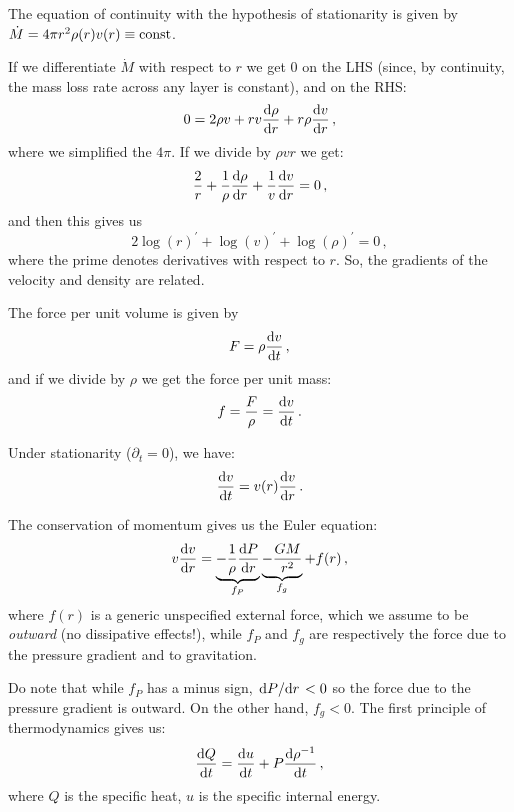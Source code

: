 \documentclass[main.tex]{subfiles}
\begin{document}
The equation of continuity with the hypothesis of stationarity is given by \(\dot{M} = 4 \pi r^2 \rho (r) v(r) \equiv \text{const}\).

If we differentiate \(\dot{M} \) with respect to \(r\) we get 0 on the LHS (since, by continuity, the mass loss rate across any layer is constant), and on the RHS: 
%
\begin{equation}
  0 = 2 \rho v + rv \dv{\rho }{r} + r \rho \dv{v}{r} 
\,,
\end{equation}
%
where we simplified the \(4 \pi \). If we divide by \(\rho v r \) we get: 
%
\begin{equation}
  \frac{2}{r} + \frac{1}{\rho }\dv{\rho }{r} + \frac{1}{v} \dv{v}{r} =0     
\,,
\end{equation}
%
and then this gives us 
%
\begin{equation}
  2\log(r)^{\prime } + \log(v)^{\prime } + \log(\rho)^{\prime } =0
\,,
\end{equation}
%
where the prime denotes derivatives with respect to \(r\).
So, the gradients of the velocity and density are related.

The force per unit volume is given by 
%
\begin{equation}
  F = \rho \dv{v}{t} 
\,,
\end{equation}
%
and if we divide by \(\rho \) we get the force per unit mass: 
%
\begin{equation}
  f = \frac{F}{\rho } = \dv{v}{t}  
\,.
\end{equation}

Under stationarity (\(\partial_t = 0\)), we have: 
%
\begin{equation}
  \dv{v}{t} = v(r) \dv{v}{r} 
\,.
\end{equation}
%

The conservation of momentum gives us the Euler equation: 
%
\begin{equation} \label{eq:momentum-conservation}
  v \dv{v}{r} = \underbrace{- \frac{1}{\rho } \dv{P}{r}}_{f_P} \underbrace{- \frac{GM}{r^2}}_{f_g} + f(r)
\,,
\end{equation}
%
where \(f(r)\) is a generic unspecified external force, which we assume to be \emph{outward} (no dissipative effects!), while \(f_P\) and \(f_g\) are respectively the force due to the pressure gradient and to gravitation.

Do note that while \(f_P\) has a minus sign, \(\dv*{P}{r}<0\) so the force due to the pressure gradient is outward. On the other hand, \(f_g<0\). 
The first principle of thermodynamics gives us:
%
\begin{equation}
  \dv{Q}{t} = \dv{u}{t} + P \dv{\rho^{-1}}{t} 
\,,
\end{equation}
%
where \(Q\) is the specific heat, \(u \) is the specific internal energy.
\end{document}
